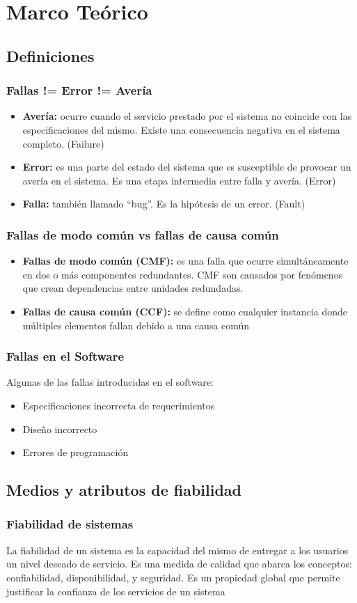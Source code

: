 \section{Marco Teórico}
\subsection{Definiciones}
\begin{frame}
    \frametitle{Fallas != Error != Avería}
    \begin{itemize}
        \item \textbf{Avería:} ocurre cuando el servicio prestado por el sistema no coincide con las especificaciones del mismo.  Existe una consecuencia negativa en el sistema completo. (Failure)
        \item \textbf{Error:} es una parte del estado del sistema que es susceptible de provocar un avería en el sistema. Es una etapa intermedia entre falla y avería. (Error)
        \item \textbf{Falla:} también llamado “bug”. Es la hipótesis de un error. (Fault)
    \end{itemize}
\end{frame}

\begin{frame}
	\frametitle{Fallas de modo común vs fallas de causa común}
	\begin{itemize}
		\item \textbf{Fallas de modo común (CMF):}  es una falla que ocurre simultáneamente en dos o más componentes redundantes. CMF son causados por fenómenos que crean dependencias entre unidades redundadas.
		\item \textbf{Fallas de causa común (CCF):} se define como cualquier instancia donde múltiples elementos fallan debido a una causa común
	\end{itemize}
\end{frame}

\begin{frame}
	\frametitle{Fallas en el Software}
	Algunas de las fallas introducidas en el software:
	\begin{itemize}
		\item Especificaciones incorrecta de requerimientos
		\item Diseño incorrecto
		\item Errores de programación
	\end{itemize}
\end{frame}

\subsection{Medios y atributos de fiabilidad}
\begin{frame}
	\frametitle{Fiabilidad de sistemas}
	La fiabilidad de un sistema es la capacidad del mismo de entregar a los usuarios un nivel deseado de servicio. 
	\vfill
	Es una medida de calidad que abarca los conceptos: confiabilidad, disponibilidad, y seguridad.
	\vfill
	Es un propiedad global que permite justificar la confianza de los servicios de un sistema 

\end{frame}

